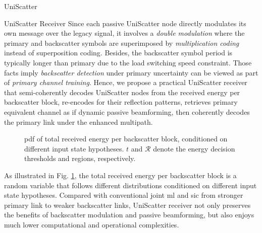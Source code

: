 \documentclass[journal]{IEEEtran}
\begin{document}
\begin{section}{UniScatter}
	\begin{subsection}{UniScatter Receiver}
		Since each passive UniScatter node directly modulates its own message over the legacy signal, it involves a \emph{double modulation} where the primary and backscatter symbols are superimposed by \emph{multiplication coding} instead of superposition coding.
		Besides, the backscatter symbol period is typically longer than primary due to the load switching speed constraint.
		Those facts imply \emph{backscatter detection} under primary uncertainty can be viewed as part of \emph{primary channel training}.
		Hence, we propose a practical UniScatter receiver that semi-coherently decodes UniScatter nodes from the received energy per backscatter block, re-encodes for their reflection patterns, retrieves primary equivalent channel as if dynamic passive beamforming, then coherently decodes the primary link under the enhanced multipath.
		\begin{figure}[!t]
			\centering
			\resizebox{0.9\columnwidth}{!}{
				
			}
			\caption{
				\gls{pdf} of total received energy per backscatter block, conditioned on different input state hypotheses.
				$t$ and $\mathcal{R}$ denote the energy decision thresholds and regions, respectively.
			}
			\label{fi:energy_distribution}
		\end{figure}
		As illustrated in Fig. \ref{fi:energy_distribution}, the total received energy per backscatter block is a random variable that follows different distributions conditioned on different input state hypotheses.
		Compared with conventional joint \gls{ml} and \gls{sic} from stronger primary link to weaker backscatter links, UniScatter receiver not only preserves the benefits of backscatter modulation and passive beamforming, but also enjoys much lower computational and operational complexities.
	\end{subsection}


\end{section}
\end{document}
